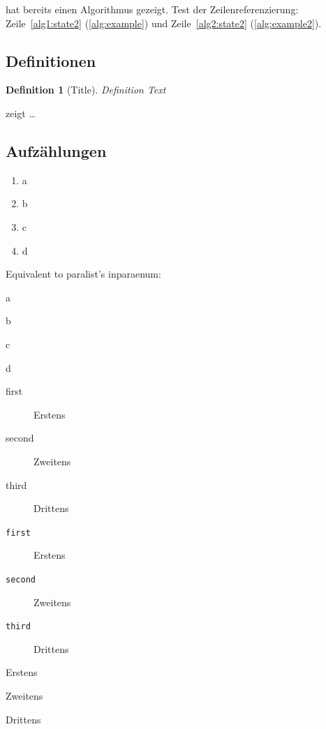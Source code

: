 \documentclass[
  numbers=noenddot,
  english,  %
  a4paper,  %
  twoside,  %
  bibliography=totoc,
  headsepline,
  cleardoublepage=empty,
  parskip=half,
  draft=false
]{scrbook}
\theoremstyle{break}
\newtheorem{definition}{Definition}[chapter]
\begin{document}
 hat bereits einen Algorithmus gezeigt.
Test der Zeilenreferenzierung: Zeile~\ref{alg1:state2} (\cref{alg:example}) und Zeile~\ref{alg2:state2} (\cref{alg:example2}).

\subsection{Definitionen}
\begin{definition}[Title]
  \label{def:def1}
  Definition Text
\end{definition}

 zeigt \ldots

\subsection{Aufzählungen}

\begin{enumerate}[label=\alph*)]
  \item a
  \item b
  \item c
  \item d
\end{enumerate}

Equivalent to paralist's inparaenum:
\begin{enumerate*}[label=\alph*)]
  \item a
  \item b
  \item c
  \item d
\end{enumerate*}

\begin{description}
  \item[first] Erstens
  \item[second] Zweitens
  \item[third] Drittens
\end{description}

\begin{description}
  \item[\texttt{first}] Erstens
  \item[\texttt{second}] Zweitens
  \item[\texttt{third}] Drittens
\end{description}

\begin{description}[font=\ttfamily]
  \item[first] Erstens
  \item[second] Zweitens
  \item[third] Drittens
\end{description}
\end{document}
